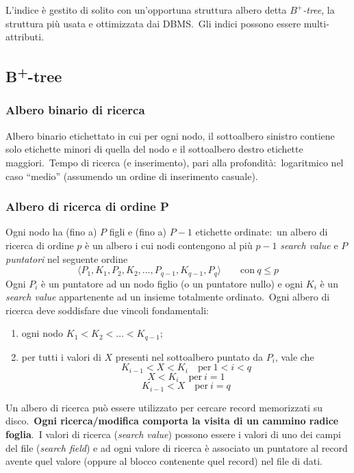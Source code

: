 L'indice è gestito di solito con un'opportuna struttura albero detta $B^+$\textit{-tree}, la struttura più usata e ottimizzata dai DBMS.\
Gli indici possono essere multi-attributi.\

\subsection{B\textsuperscript{+}-tree}

\subsubsection{Albero binario di ricerca}

Albero binario etichettato in cui per ogni nodo, il sottoalbero sinistro contiene solo etichette minori di quella del nodo e il sottoalbero destro etichette maggiori.\
Tempo di ricerca (e inserimento), pari alla profondità:\ logaritmico nel caso ``medio'' (assumendo un ordine di inserimento casuale).\

\subsubsection{Albero di ricerca di ordine P}

Ogni nodo ha (fino a) $P$ figli e (fino a) $P-1$ etichette ordinate:\ un albero di ricerca di ordine $p$ è un albero i cui nodi contengono al più $p-1$ \textit{search value} e $P$ \textit{puntatori} nel seguente ordine
\[\langle P_1, K_1, P_2, K_2,\dots, P_{q-1}, K_{q-1}, P_q\rangle\qquad  \mathrm{con}\ q \leq p\]
Ogni $P_i$ è un puntatore ad un nodo figlio (o un puntatore nullo) e ogni $K_i$ è un \textit{search value} appartenente ad un insieme totalmente ordinato.\
Ogni albero di ricerca deve soddisfare due vincoli fondamentali:
\begin{enumerate}
	\item ogni nodo $K_1 < K_2 < \dots < K_{q-1}$;
	\item per tutti i valori di $X$ presenti nel sottoalbero puntato da $P_i$, vale che \[K_{i-1} < X < K_i\quad \mathrm{per}\ 1 < i < q\] \[X < K_i\quad \mathrm{per}\ i = 1\] \[K_{i-1} < X \quad\mathrm{per}\ i = q\]
\end{enumerate}

\noindent Un albero di ricerca può essere utilizzato per cercare record memorizzati su disco.\
\textbf{Ogni ricerca/modifica comporta la visita di un cammino radice foglia}.\
I valori di ricerca (\textit{search value}) possono essere i valori di uno dei campi del file (\textit{search field}) e ad ogni valore di ricerca è associato un puntatore al record avente quel valore (oppure al blocco contenente quel record) nel file di dati.\

